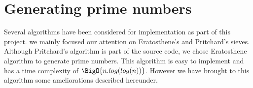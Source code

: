 \newpage\cleardoublepage{}
\section{Generating prime numbers}

Several algorithms have been considered for implementation as part of this project. we mainly focused our attention on Eratosthene's and Pritchard's sieves. Although Pritchard's algorithm is part of the source code, we chose Eratosthene algorithm to generate prime numbers. This algorithm is easy to implement and has a time complexity of $\BigO{n.log(log (n))}$. However we have brought to this algorithm some ameliorations described hereunder.